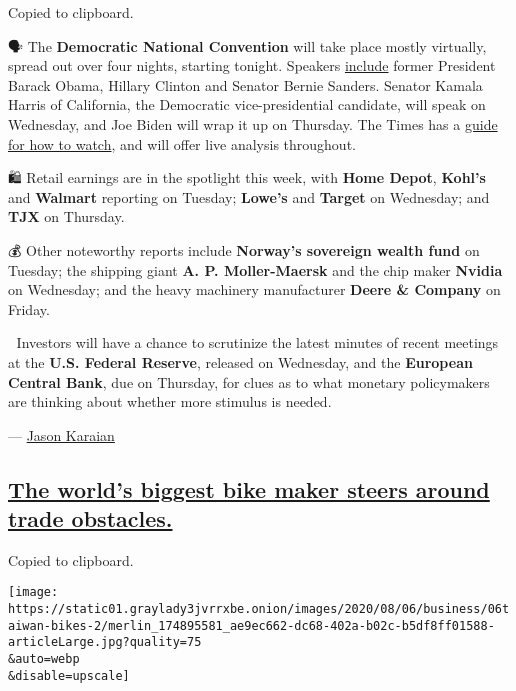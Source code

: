 Copied to clipboard.

🗣 The \textbf{Democratic National Convention} will take place mostly
virtually, spread out over four nights, starting tonight. Speakers
\href{https://www.washingtonpost.com/politics/unconventional-democratic-convention-will-juggle-hundreds-of-live-feeds-to-re-create-the-feel-of-a-party-celebration/2020/08/15/02f887de-de60-11ea-809e-b8be57ba616e_story.html}{include}
former President Barack Obama, Hillary Clinton and Senator Bernie
Sanders. Senator Kamala Harris of California, the Democratic
vice-presidential candidate, will speak on Wednesday, and Joe Biden will
wrap it up on Thursday. The Times has a
\href{https://www.nytimes3xbfgragh.onion/2020/08/17/us/politics/democratic-national-convention-speakers-schedule.html}{guide
for how to watch}, and will offer live analysis throughout.

🛍 Retail earnings are in the spotlight this week, with \textbf{Home
Depot}, \textbf{Kohl's} and \textbf{Walmart} reporting on Tuesday;
\textbf{Lowe's} and \textbf{Target} on Wednesday; and \textbf{TJX} on
Thursday.

💰 Other noteworthy reports include \textbf{Norway's sovereign wealth
fund} on Tuesday; the shipping giant \textbf{A. P. Moller-Maersk} and
the chip maker \textbf{Nvidia} on Wednesday; and the heavy machinery
manufacturer \textbf{Deere \& Company} on Friday.

\textbf{🏦} Investors will have a chance to scrutinize the latest minutes
of recent meetings at the \textbf{U.S. Federal Reserve}, released on
Wednesday, and the \textbf{European Central Bank}, due on Thursday, for
clues as to what monetary policymakers are thinking about whether more
stimulus is needed.

--- \href{https://www.nytimes3xbfgragh.onion/by/jason-karaian}{Jason
Karaian}

\hypertarget{the-worlds-biggest-bike-maker-steers-around-trade-obstacles}{%
\subsection{\texorpdfstring{\protect\hyperlink{the-worlds-biggest-bike-maker-steers-around-trade-obstacles}{The
world's biggest bike maker steers around trade
obstacles.}}{The world's biggest bike maker steers around trade obstacles.}}\label{the-worlds-biggest-bike-maker-steers-around-trade-obstacles}}

Copied to clipboard.

\texttt{[image: https://static01.graylady3jvrrxbe.onion/images/2020/08/06/business/06taiwan-bikes-2/merlin\_174895581\_ae9ec662-dc68-402a-b02c-b5df8ff01588-articleLarge.jpg?quality=75\\\&auto=webp\\\&disable=upscale]}

